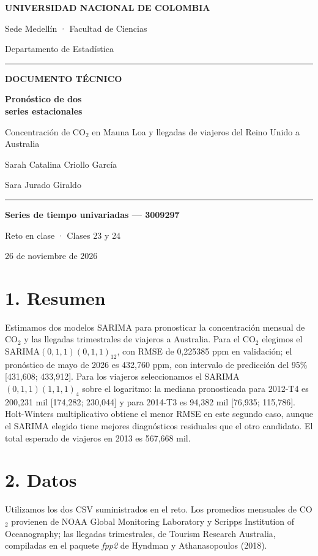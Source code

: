 \documentclass[11pt,a4paper]{article}
\newcommand{\seccion}[1]{\section*{\color{verde}#1}}
\begin{document}
\begin{titlepage}
\thispagestyle{empty}
{\large\bfseries\color{verde} UNIVERSIDAD NACIONAL DE COLOMBIA}\par
\smallskip
{\normalsize Sede Medellín · Facultad de Ciencias\par Departamento de Estadística}\par
\vspace{1cm}
{\color{verde}\rule{\textwidth}{1.5pt}}\par
\vspace{2.1cm}
{\small\bfseries\color{gris} DOCUMENTO TÉCNICO}\par
\vspace{0.35cm}
{\fontsize{30}{36}\selectfont\bfseries\color{verde} Pronóstico de dos\\ series estacionales\par}
\vspace{0.55cm}
{\Large Concentración de CO$_2$ en Mauna Loa y llegadas de viajeros del Reino Unido a Australia\par}
\vspace{1.35cm}
{\large Sarah Catalina Criollo García\par Sara Jurado Giraldo\par}
\vfill
{\color{verde}\rule{\textwidth}{0.8pt}}\par
\medskip
\textbf{Series de tiempo univariadas — 3009297}\par
Reto en clase · Clases 23 y 24\par
26 de noviembre de 2026\par
\end{titlepage}
\seccion{1. Resumen}
Estimamos dos modelos SARIMA para pronosticar la concentración mensual de CO$_2$ y las llegadas trimestrales de viajeros a Australia. Para el CO$_2$ elegimos el SARIMA$(0,1,1)(0,1,1)_{12}$, con RMSE de 0,225385 ppm en validación; el pronóstico de mayo de 2026 es 432,760 ppm, con intervalo de predicción del 95\% [431,608; 433,912]. Para los viajeros seleccionamos el SARIMA$(0,1,1)(1,1,1)_4$ sobre el logaritmo: la mediana pronosticada para 2012-T4 es 200,231 mil [174,282; 230,044] y para 2014-T3 es 94,382 mil [76,935; 115,786]. Holt-Winters multiplicativo obtiene el menor RMSE en este segundo caso, aunque el SARIMA elegido tiene mejores diagnósticos residuales que el otro candidato. El total esperado de viajeros en 2013 es 567,668 mil.
\seccion{2. Datos}
Utilizamos los dos CSV suministrados en el reto. Los promedios mensuales de CO$_2$ provienen de NOAA Global Monitoring Laboratory y Scripps Institution of Oceanography; las llegadas trimestrales, de Tourism Research Australia, compiladas en el paquete \textit{fpp2} de Hyndman y Athanasopoulos (2018).
\end{document}

